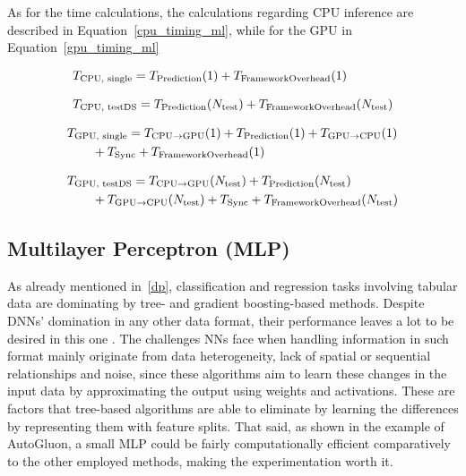 As for the time calculations, the calculations regarding CPU inference are described in Equation~\ref{cpu_timing_ml}, while for the GPU in Equation~\ref{gpu_timing_ml}

\begin{subequations}\label{cpu_timing_ml}
\renewcommand{\theequation}{\theparentequation.\arabic{equation}}
\begin{align}
&T_{\text{CPU, single}} =
T_{\text{Prediction}}(1) +
T_{\text{FrameworkOverhead}}(1)
\label{eq:cpu_ml_single}\\[8pt]
&T_{\text{CPU, testDS}} =
T_{\text{Prediction}}(N_{\text{test}}) +
T_{\text{FrameworkOverhead}}(N_{\text{test}})
\label{eq:cpu_ml_test}
\end{align}
\end{subequations}

\begin{subequations}\label{gpu_timing_ml}
\renewcommand{\theequation}{\theparentequation.\arabic{equation}}
\begin{align}
&T_{\text{GPU, single}} =
T_{\text{CPU}\rightarrow\text{GPU}}(1) +
T_{\text{Prediction}}(1) +
T_{\text{GPU}\rightarrow\text{CPU}}(1)
\notag\\
&\qquad +
T_{\text{Sync}} +
T_{\text{FrameworkOverhead}}(1)
\label{eq:gpu_ml_single}\\[8pt]
&T_{\text{GPU, testDS}} =
T_{\text{CPU}\rightarrow\text{GPU}}(N_{\text{test}}) +
T_{\text{Prediction}}(N_{\text{test}})
\notag\\
&\qquad +
T_{\text{GPU}\rightarrow\text{CPU}}(N_{\text{test}}) +
T_{\text{Sync}} +
T_{\text{FrameworkOverhead}}(N_{\text{test}})
\label{eq:gpu_ml_test}
\end{align}
\end{subequations}

\subsection{Multilayer Perceptron (MLP)}
\label{mlp-section}

As already mentioned in~\ref{dp}, classification and regression tasks involving tabular data are dominating by tree- and gradient boosting-based methods. Despite DNNs' domination in any other data format, their performance leaves a lot to be desired in this one \cite{representationlearning, tabnet,tabdata-nn}. The challenges NNs face when handling information in such format mainly originate from data heterogeneity, lack of spatial or sequential relationships and noise, since these algorithms aim to learn these changes in the input data by approximating the output using weights and activations. These are factors that tree-based algorithms are able to eliminate by learning the differences by representing them with feature splits. That said, as shown in the example of AutoGluon, a small MLP could be fairly computationally efficient comparatively to the other employed methods, making the experimentation worth it.

